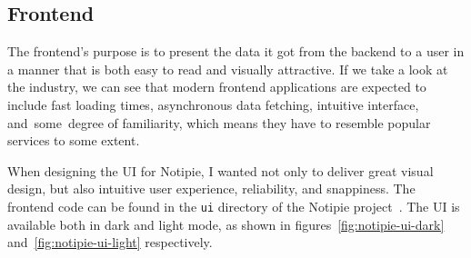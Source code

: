 \subsection{Frontend}\label{sec:frontend}

The frontend's purpose is to present the data
it got from the backend to a user
in a manner that is both easy to read
and visually attractive.
If we take a look at the industry,
we can see that modern frontend applications
are expected to include
fast loading times,
asynchronous data fetching,
intuitive interface,
and~some~degree of familiarity,
which means they have to resemble
popular services to some extent.

When designing the \ac{UI} for Notipie,
I wanted not only to deliver great visual design,
but also intuitive user experience,
reliability,
and snappiness.
The front\-end code
can be found in the
\texttt{ui} directory of the Notipie project~\cite{sewera_notipie_2022-5}.
The \ac{UI} is available both in dark and light mode,
as shown in figures~\ref{fig:notipie-ui-dark}
and~\ref{fig:notipie-ui-light} respectively.

